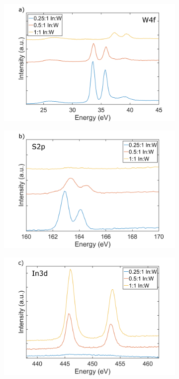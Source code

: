 \begin{figure}[!h]
	\begin{center}
		\begin{subfigure}[b]{1\textwidth}
			\includegraphics[scale=0.35]{In/XPSW4f.png}
			\label{fig:InXPSW4f}
		\end{subfigure}
		\qquad
		\begin{subfigure}[b]{1\textwidth}
			\includegraphics[scale=0.35]{In/XPSS2p.png}
			\label{fig:InXPSS2p}
		\end{subfigure}
		\begin{subfigure}[b]{1\textwidth}
			\includegraphics[scale=0.35]{In/XPSIn3d.png}

\end{subfigure}
\end{center}
\end{figure}

